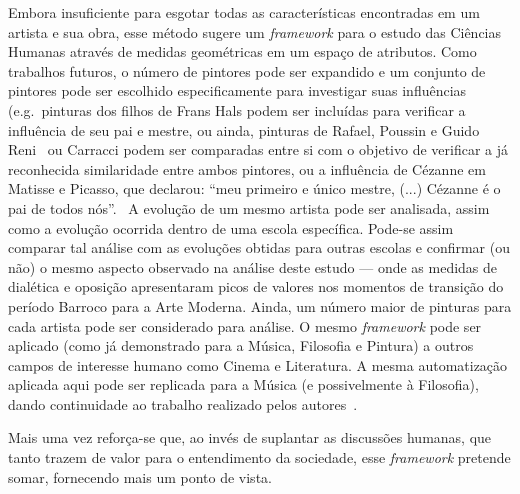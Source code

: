Embora insuficiente para esgotar todas as características encontradas
em um artista e sua obra, esse método sugere um \textit{framework}
para o estudo das Ciências Humanas através de medidas geométricas em
um espaço de atributos.  Como trabalhos futuros, o número de pintores
pode ser expandido e um conjunto de pintores pode ser escolhido
especificamente para investigar suas influências (e.g.\ pinturas dos
filhos de Frans Hals podem ser incluídas para verificar a influência
de seu pai e mestre, ou ainda, pinturas de Rafael, Poussin e Guido
Reni~\cite{gombrich} ou Carracci podem ser comparadas entre si com o
objetivo de verificar a já reconhecida similaridade entre ambos
pintores, ou a influência de Cézanne em Matisse e Picasso, que
declarou: ``meu primeiro e único mestre, (...)  Cézanne é o pai de
todos nós''.~\cite{rishel} A evolução de um mesmo artista pode ser
analisada, assim como a evolução ocorrida dentro de uma escola
específica. Pode-se assim comparar tal análise com as evoluções
obtidas para outras escolas e confirmar (ou não) o mesmo aspecto
observado na análise deste estudo --- onde as medidas de dialética e
oposição apresentaram picos de valores nos momentos de transição do
período Barroco para a Arte Moderna. Ainda, um número maior de
pinturas para cada artista pode ser considerado para análise. O mesmo
\textit{framework} pode ser aplicado (como já demonstrado para a
Música, Filosofia e Pintura) a outros campos de interesse humano como
Cinema e Literatura. A mesma automatização aplicada aqui pode ser
replicada para a Música (e possivelmente à Filosofia), dando
continuidade ao trabalho realizado pelos autores~\cite{vieira}.

Mais uma vez reforça-se que, ao invés de suplantar as discussões humanas, que
tanto trazem de valor para o entendimento da sociedade, esse \textit{framework}
pretende somar, fornecendo mais um ponto de vista.
